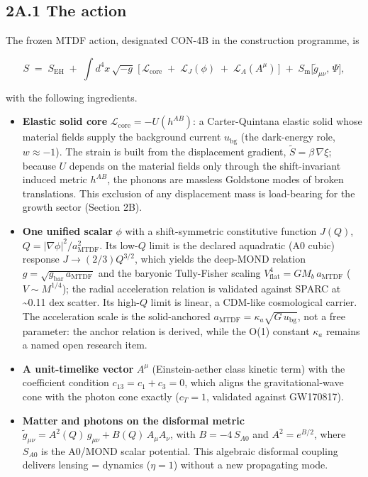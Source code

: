 \documentclass[11pt,a4paper]{article}
\begin{document}
\subsection*{2A.1 The action}
The frozen MTDF action, designated CON-4B in the construction programme, is

\[
S \;=\; S_{\mathrm{EH}} \;+\; \int d^4x\,\sqrt{-g}\;\Big[\, \mathcal{L}_{\mathrm{core}} \;+\; \mathcal{L}_{J}(\phi) \;+\; \mathcal{L}_{A}(A^\mu) \,\Big] \;+\; S_{\mathrm{m}}\big[\tilde{g}_{\mu\nu},\,\Psi\big],
\]

with the following ingredients.

\begin{itemize}
  \item \textbf{Elastic solid core} \(\mathcal{L}_{\mathrm{core}} = -U(h^{AB})\): a Carter-Quintana elastic solid whose material fields supply the background current \(u_{\mathrm{bg}}\) (the dark-energy role, \(w \approx -1\)). The strain is built from the displacement gradient, \(\tilde{S} = \beta\,\nabla\xi\); because \(U\) depends on the material fields only through the shift-invariant induced metric \(h^{AB}\), the phonons are massless Goldstone modes of broken translations. This exclusion of any displacement mass is load-bearing for the growth sector (Section 2B).
  \item \textbf{One unified scalar} \(\phi\) with a shift-symmetric constitutive function \(J(Q)\), \(Q = |\nabla\phi|^2/a_{\mathrm{MTDF}}^2\). Its low-\(Q\) limit is the declared aquadratic (A0 cubic) response \(J \to (2/3)Q^{3/2}\), which yields the deep-MOND relation \(g = \sqrt{g_{\mathrm{bar}}\,a_{\mathrm{MTDF}}}\) and the baryonic Tully-Fisher scaling \(V_{\mathrm{flat}}^4 = G M_b\, a_{\mathrm{MTDF}}\) (\(V \sim M^{1/4}\)); the radial acceleration relation is validated against SPARC at \~{}0.11 dex scatter. Its high-\(Q\) limit is linear, a CDM-like cosmological carrier. The acceleration scale is the solid-anchored \(a_{\mathrm{MTDF}} = \kappa_a \sqrt{G\,u_{\mathrm{bg}}}\), not a free parameter: the anchor relation is derived, while the O(1) constant \(\kappa_a\) remains a named open research item.
  \item \textbf{A unit-timelike vector} \(A^\mu\) (Einstein-aether class kinetic term) with the coefficient condition \(c_{13} = c_1 + c_3 = 0\), which aligns the gravitational-wave cone with the photon cone exactly (\(c_T = 1\), validated against GW170817).
  \item \textbf{Matter and photons on the disformal metric} \(\tilde{g}_{\mu\nu} = A^2(Q)\, g_{\mu\nu} + B(Q)\, A_\mu A_\nu\), with \(B = -4\,S_{A0}\) and \(A^2 = e^{B/2}\), where \(S_{A0}\) is the A0/\allowbreak{}MOND scalar potential. This algebraic disformal coupling delivers lensing = dynamics (\(\eta = 1\)) without a new propagating mode.
\end{itemize}
\end{document}
